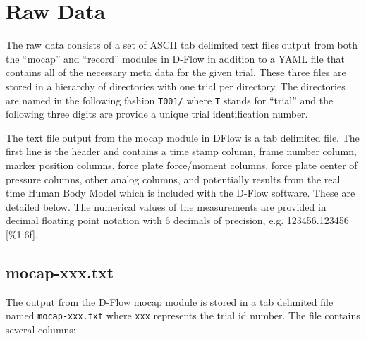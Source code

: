 \documentclass[10pt,a4paper,twocolumn]{article}
\begin{document}
\section*{Raw Data}
%
The raw data consists of a set of ASCII tab delimited text files output from
both the ``mocap'' and ``record'' modules in D-Flow in addition to a YAML file
that contains all of the necessary meta data for the given trial. These three
files are stored in a hierarchy of directories with one trial per directory.
The directories are named in the following fashion \verb+T001/+ where \verb+T+
stands for ``trial'' and the following three digits are provide a unique trial
identification number.

The text file output from the mocap module in DFlow is a tab delimited file.
The first line is the header and contains a time stamp column, frame number
column, marker position columns, force plate force/moment columns, force plate
center of pressure columns, other analog columns, and potentially results from
the real time Human Body Model \cite{Bogert2013} which is included with the
D-Flow software. These are detailed below. The numerical values of the
measurements are provided in decimal floating point notation with 6 decimals of
precision, e.g. 123456.123456 [\%1.6f].

\subsection*{mocap-xxx.txt}

The output from the D-Flow mocap module is stored in a tab delimited file named
\verb+mocap-xxx.txt+ where \verb+xxx+ represents the trial id number. The file
contains several columns:
\end{document}
